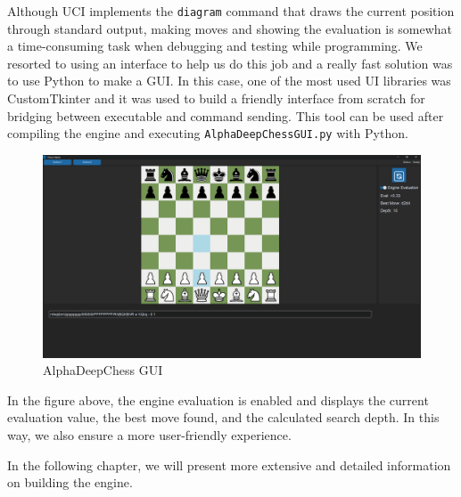\vspace{1em}

\noindent Although UCI implements the \texttt{diagram} command that draws the current position through standard output, making moves and showing the evaluation is somewhat a time-consuming task when debugging and testing while programming. We resorted to using an interface to help us do this job and a really fast solution was to use Python to make a GUI. In this case, one of the most used UI libraries was CustomTkinter and it was used to build a friendly interface from scratch for bridging between executable and command sending. This tool can be used after compiling the engine and executing \texttt{AlphaDeepChessGUI.py} with Python.

\begin{center}
    \begin{figure}[H]
    \centering
        \includegraphics[width=1.0\textwidth]{Imagenes/gui.png}
        \caption{AlphaDeepChess GUI}
    \end{figure}
\end{center}

\noindent In the figure above, the engine evaluation is enabled and displays the current evaluation value, the best move found, and the calculated search depth. In this way, we also ensure a more user-friendly experience.

\vspace{1em}

\noindent In the following chapter, we will present more extensive and detailed information on building the engine.
